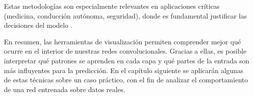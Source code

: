 Estas metodologías son especialmente relevantes en aplicaciones críticas (medicina, conducción autónoma, seguridad), donde es fundamental justificar las decisiones del modelo \cite{examples_nn__kulik_2009, conv_nn_face_recog__chowanda_2019, slam_vehicles__saleem_2023}.

En resumen, las herramientas de visualización permiten comprender mejor qué ocurre en el interior de nuestras redes convolucionales. Gracias a ellas, es posible interpretar qué patrones se aprenden en cada capa y qué partes de la entrada son más influyentes para la predicción.
En el capítulo siguiente se aplicarán algunas de estas técnicas sobre un caso práctico, con el fin de analizar el comportamiento de una red entrenada sobre datos reales.

